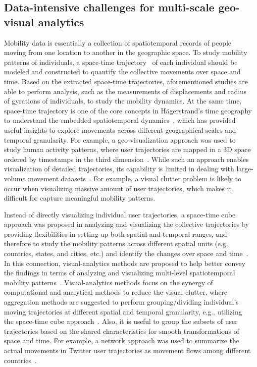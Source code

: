 \documentclass[a4paper, 11pt]{article}
\begin{document}
\subsection{Data-intensive challenges for multi-scale geo-visual analytics}
Mobility data is essentially a collection of spatiotemporal records of people moving from one location to another in the geographic space.
To study mobility patterns of individuals, a space-time trajectory~\citep{hagerstrand1985time} of each individual should be modeled and constructed to quantify the collective movements over space and time.
Based on the extracted space-time trajectories, aforementioned studies are able to perform analysis, such as the measurements of displacements and radius of gyrations of individuals, to study the mobility dynamics.
At the same time, space-time trajectory is one of the core concepts in H{\"a}gerstrand's time geography to understand the embedded spatiotemporal dynamics~\citep{hagerstrand1985time}, which has provided useful insights to explore movements across different geographical scales and temporal granularity.
For example, a geo-visualization approach was used to study human activity patterns, where user trajectories are mapped in a 3D space ordered by timestamps in the third dimension~\citep{kwan2004geovisualization}. While such an approach enables visualization of detailed trajectories, its capability is limited in dealing with large-volume movement datasets~\citep{andrienko2007designing}.
For example, a visual clutter problem is likely to occur when visualizing massive amount of user trajectories, which makes it difficult for capture meaningful mobility patterns.

Instead of directly visualizing individual user trajectories, a space-time cube approach was proposed in analyzing and visualizing the collective trajectories by providing flexibilities in setting up both spatial and temporal ranges, and therefore to study the mobility patterns across different spatial units (e.g. countries, states, and cities, etc.) and identify the changes over space and time~\citep{maceachren2001research, maceachren2004maps}.
In this connection, visual-analytics methods are proposed to help better convey the findings in terms of analyzing and visualizing multi-level spatiotemporal mobility patterns~\citep{andrienko2007designing,andrienko2007visual}.
Visual-analytics methods focus on the synergy of computational and analytical methods to reduce the visual clutter, where aggregation methods are suggested to perform grouping/dividing individual's moving trajectories at different spatial and temporal granularity, e.g., utilizing the space-time cube approach~\citep{andrienko2007designing}.
Also, it is useful to group the subsets of user trajectories based on the shared characteristics for smooth transformations of space and time. For example, a network approach was used to summarize the actual movements in Twitter user trajectories as movement flows among different countries~\citep{hawelka2014geo}.
\end{document}
